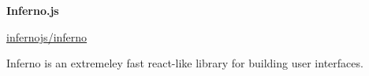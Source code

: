 

\raggedright

{\large\textbf{Inferno.js}}

\href{http://github.com/infernojs}{infernojs/inferno}

Inferno is an extremeley fast react-like library for building user interfaces.

